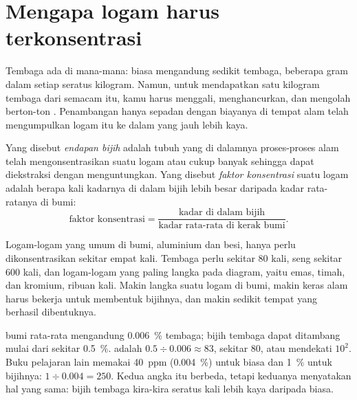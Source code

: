 \section{Mengapa logam harus terkonsentrasi}

Tembaga ada di mana-mana:  biasa mengandung sedikit tembaga,
beberapa gram dalam setiap seratus kilogram. Namun, untuk mendapatkan satu
kilogram tembaga dari  semacam itu, kamu harus menggali, menghancurkan,
dan mengolah berton-ton . Penambangan hanya sepadan dengan biayanya
di tempat alam telah mengumpulkan logam itu ke dalam  yang jauh
lebih kaya.

\begin{definition}\label{def:g9:earth-resources:ore-deposit}
Yang disebut \emph{endapan bijih} adalah tubuh 
yang di dalamnya proses-proses alam telah mengonsentrasikan suatu logam
atau  cukup banyak sehingga dapat diekstraksi dengan menguntungkan.
Yang disebut \emph{faktor konsentrasi} suatu
logam adalah berapa kali kadarnya di dalam bijih lebih besar daripada
kadar rata-ratanya di  bumi:
\[
\text{faktor konsentrasi} = \frac{\text{kadar di dalam bijih}}{\text{kadar rata-rata di kerak bumi}} .
\]
\end{definition}

Logam-logam yang umum di  bumi, aluminium dan besi, hanya perlu
dikonsentrasikan sekitar empat kali. Tembaga perlu sekitar 80 kali, seng
sekitar 600 kali, dan logam-logam yang paling langka pada diagram, yaitu
emas, timah, dan kromium, ribuan kali. Makin langka suatu logam di 
bumi, makin keras alam harus bekerja untuk membentuk bijihnya, dan makin
sedikit tempat yang berhasil dibentuknya.

\begin{example}[Tembaga]
 bumi rata-rata mengandung \qty{0.006}{\%} tembaga; bijih tembaga
dapat ditambang mulai dari sekitar \qty{0.5}{\%}. 
adalah $0.5 \div 0.006
\approx 83$, sekitar 80, atau mendekati $10^2$. Buku pelajaran lain memakai
\qty{40}{ppm} (\qty{0.004}{\%}) untuk  biasa dan \qty{1}{\%} untuk
bijihnya: $1 \div
0.004 = 250$. Kedua angka itu berbeda, tetapi keduanya menyatakan hal yang
sama: bijih tembaga kira-kira seratus kali lebih kaya daripada 
biasa.
\end{example}

